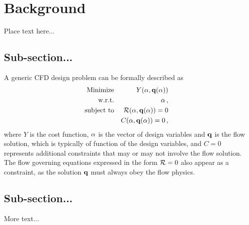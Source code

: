 
\section{Background}
\label{sec:backg}

Place text here...


\subsection{Sub-section...}

A generic CFD design problem can be formally described as
%
\begin{eqnarray}
  {\rm Minimize}   && Y({\bf \alpha},{\bf q}({\bf \alpha}))            \nonumber           \\
  {\rm w.r.t.}     && {\bf \alpha} \,,                                 \label{eq:minimize} \\
  {\rm subject~to} && {\cal R}({\bf \alpha},{\bf q}({\bf \alpha})) = 0 \nonumber           \\
                   &&       C ({\bf \alpha},{\bf q}({\bf \alpha})) = 0 \,, \nonumber
\end{eqnarray}
%
where $Y$ is the cost function, ${\bf \alpha}$ is the vector of design variables and ${\bf q}$ is the flow solution, which is typically of function of the design variables, and $C = 0$ represents additional constraints that may or may not involve the flow solution.
%
The flow governing equations expressed in the form ${\cal R} = 0$ also appear as a constraint, as the solution ${\bf q}$ must always obey the flow physics.


\subsection{Sub-section...}

More text...

